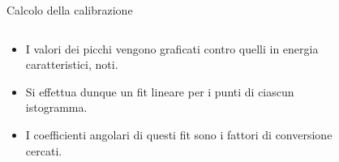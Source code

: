 \documentclass [xcolor=svgnames] {beamer}
\begin{document}
\begin{frame}{Calcolo della calibrazione}
	\begin{columns}
		\begin{column}{0.4\textwidth}
			\begin{itemize}
				\item<1-> I valori dei picchi vengono graficati contro quelli in energia caratteristici, noti.
				\item<3-> Si effettua dunque un fit lineare per i punti di ciascun istogramma.
				\item<4-> I coefficienti angolari di questi fit sono i fattori di conversione cercati.
			\end{itemize}
		\end{column}
		\begin{column}{0.5\textwidth}
			\begin{figure}
				\centering
			\end{figure}
		\end{column}
	\end{columns}
	
\end{frame}
\end{document}
